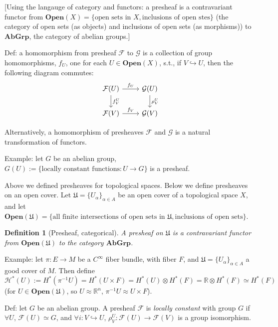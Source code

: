 \documentclass{article}
\theoremstyle{mystyle}
\newtheorem*{definition}{Definition}%
\theoremstyle{remark}
\numberwithin{equation}{section}
\begin{document}
[Using the langauge of category and functors: a presheaf is a contravariant functor from $\mathbf{Open}(X) = \{\text{open sets in }X,\text{inclusions of open stes}\}$
(the category of open sets (as objects) and inclusions of open sets (as morphisms)) to $\mathbf{Ab Grp}$, the category of abelian groups.]

Def: a homomorphism from presheaf $\mathcal{F}$ to $\mathcal{G}$ is a collection of group homomorphisms, $f_U$, one for each $U\in \mathbf{Open}(X)$, s.t., if $V\hookrightarrow U$, then the following diagram commutes:
$$
\begin{tikzcd}
\mathcal{F}(U)\ar[d,"f^U_V"]\ar[r,"f_U"] & \mathcal{G}(U) \ar[d,"\rho^U_V"]\\
\mathcal{F}(V)\ar[r,"f_V"] &\mathcal{G}(V)
\end{tikzcd}$$

Alternatively, a homomorphism of presheaves $\mathcal{F}$ and $\mathcal{G}$ is a natural transformation of functors.

Example: let $G$ be an abelian group, $G(U):=\{\text{locally constant functions}\colon U\rightarrow G\}$ is a presheaf.

Above we defined presheaves for topological spaces. Below we define presheaves on an open cover. Let $\mathfrak{U} = \{U_\alpha\}_{\alpha \in A}$ be an open cover of a topological space $X$, and let $\mathbf{Open}(\mathfrak{U}) = \{\text{all finite intersections of open sets in }\mathfrak{U}, \text{inclusions of open sets}\}$.

\begin{definition}[Presheaf, categorical]
A \emph{presheaf} on $\mathfrak{U}$ is a contravariant functor from $\mathbf{Open}(\mathfrak{U})$ to the category $\mathbf{Ab Grp}$.
\end{definition}

Example: let $\pi\colon E\rightarrow M$ be a $C^\infty$ fiber bundle, with fiber $F$, and $\mathfrak{U} = \{U_\alpha\}_{\alpha \in A}$ a good cover of $M$. Then define $\mathcal{H}^*(U):= H^*(\pi^{-1}U) = H^*(U\times F) = H^*(U)\otimes H^*(F) = \mathbb{R}\otimes H^*(F) \simeq H^*(F)$ (for $U\in \mathbf{Open}(\mathfrak{U})$, so $U\approx \mathbb{R}^n$, $\pi^{-1}U \approx U\times F$). 

Def: let $G$ be an abelian group. A presheaf $\mathcal{F}$ is \emph{locally constant} with group $G$ if $\forall U$, $\mathcal{F}(U)\simeq G$, and $\forall i\colon V\hookrightarrow U$, $\rho^U_V\colon \mathcal{F}(U)\rightarrow \mathcal{F}(V)$ is a group isomorphism.
\end{document}
